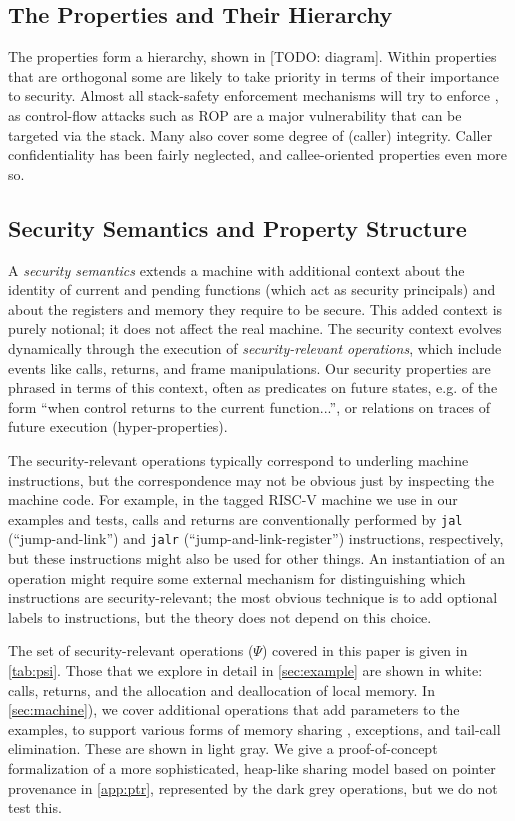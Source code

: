 \subsection{The Properties and Their Hierarchy}

The properties form a hierarchy, shown in [TODO: diagram].
Within properties that are orthogonal
some are likely to take priority in terms of their
importance to security. Almost all stack-safety enforcement mechanisms will try to enforce {\wbcf},
as control-flow attacks such as ROP are a major vulnerability that can be targeted via the stack.
Many also cover some degree of (caller) integrity. Caller confidentiality has been fairly neglected,
and callee-oriented properties even more so.

\subsection{Security Semantics and Property Structure}

A {\em security semantics} extends a machine
with additional context about the identity of current and pending
functions (which act as security principals) and about the registers and memory they require
to be secure. This added context is purely notional;
it does not affect the real machine. The security context
evolves dynamically through the execution of {\em security-relevant operations},
which include events like calls, returns, and frame manipulations.
Our security properties are phrased in terms of this context, often as predicates
on future states, e.g. of the form ``when control returns to the current function...'',
or relations on traces of future execution (hyper-properties).

The security-relevant operations typically correspond to underling machine instructions,
but the correspondence may not be obvious just by inspecting the machine code.
For example, in the tagged RISC-V machine we use in our examples and tests,
calls and returns are conventionally performed by {\tt jal} (``jump-and-link'')
and {\tt jalr} (``jump-and-link-register'') instructions, respectively, but these
instructions might also be used for other things. An instantiation of an operation
might require some external mechanism for distinguishing which instructions are
security-relevant; the most obvious technique is to add optional labels to instructions,
but the theory does not depend on this choice.

The set of security-relevant operations (\(\Psi\)) covered in this paper is given in
\cref{tab:psi}. Those that we explore in detail in \cref{sec:example}
are shown in white: calls, returns, and the allocation and deallocation of local memory.
In \cref{sec:machine}), we cover additional operations that add parameters to the examples,
to support various forms of memory sharing \ifexceptions , exceptions, \fi
and tail-call elimination. These are shown in light gray.
We give a proof-of-concept formalization of a more sophisticated, heap-like sharing model
based on pointer provenance in \cref{app:ptr}, represented by the dark grey
operations, but we do not test this.

